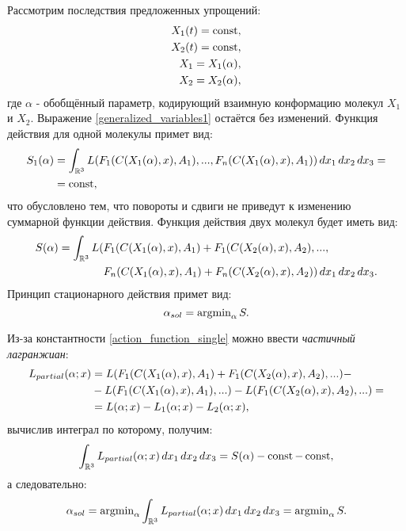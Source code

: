 Рассмотрим последствия предложенных упрощений:
\begin{align}
	X_1(t) = \operatorname{const}, \\
	X_2(t) = \operatorname{const}, \\
	X_1 = X_1(\alpha), \\
	X_2 = X_2(\alpha),
\end{align}
где $\alpha$ - обобщённый параметр, кодирующий взаимную конформацию молекул $X_1$ и $X_2$. Выражение \ref{generalized_variables1} остаётся без изменений.
Функция действия для одной молекулы примет вид:
\begin{align}
	S_1(\alpha) &= \int_{\mathbb{R}^3}L(F_1(C(X_1(\alpha), x), A_1), ...,F_n(C(X_1(\alpha), x), A_1)) \, dx_1 \, dx_2 \, dx_3 = \notag \\
				 &= \operatorname{const},
	\label{action_function_single}
\end{align}
что обусловлено тем, что повороты и сдвиги не приведут к изменению суммарной функции действия. Функция действия двух молекул будет иметь вид:
\begin{align}
	S(\alpha) = \int_{\mathbb{R}^3}L(&F_1(C(X_1(\alpha), x), A_1)+F_1(C(X_2(\alpha), x), A_2), ..., \notag \\
                                                     &F_n(C(X_1(\alpha), x), A_1) + F_n(C(X_2(\alpha), x), A_2)) \, dx_1 \, dx_2 \, dx_3.
	\label{action_function_two}
\end{align}
Принцип стационарного действия примет вид:
\begin{equation}
	\alpha_{sol} = \operatorname{argmin}_{\alpha}S.
	\label{lagrangian_principle_practical}
\end{equation}

Из-за константности \ref{action_function_single} можно ввести \textit{частичный лагранжиан}:
\begin{align}
	L_{partial}(\alpha; x) &= L(F_1(C(X_1(\alpha), x), A_1)+F_1(C(X_2(\alpha), x), A_2), ...) - \notag \\
						   &- L(F_1(C(X_1(\alpha), x), A_1), ...) - L(F_1(C(X_2(\alpha), x), A_2), ...) = \notag \\
						   &= L(\alpha; x) - L_1(\alpha; x) - L_2(\alpha; x),
	\label{partial_lagrangian}
\end{align}
вычислив интеграл по которому, получим:
\begin{equation}
	\int_{\mathbb{R}^3}L_{partial}(\alpha; x) \, dx_1 \, dx_2 \, dx_3 = S(\alpha) - \operatorname{const} - \operatorname{const},
\end{equation}
а следовательно:
\begin{equation}
	\alpha_{sol} = \operatorname{argmin}_{\alpha}\int_{\mathbb{R}^3}L_{partial}(\alpha; x) \, dx_1 \, dx_2 \, dx_3 = \operatorname{argmin}_{\alpha}S.
	\label{lagrangian_principle_practical_partial}
\end{equation}

